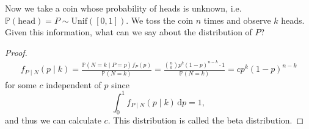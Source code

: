 \begin{eg}
    Now we take a coin whose probability of heads is unknown, i.e. \(\mathbb{P} (\text{head}) = P \sim \mathrm{Unif}([0, 1]) \). We toss the coin \(n\) times and observe \(k\) heads. Given this information, what can we say about the distribution of \(P\)?   
\end{eg}

\begin{proof}
    \begin{align*}
        f_{P \mid N} (p \mid k) = \frac{\mathbb{P} (N = k \mid P = p) f_P(p)}{\mathbb{P} (N = k)} = \frac{\binom{n}{k} p^k (1 - p)^{n - k} \cdot 1}{\mathbb{P} (N = k)} = c p^k (1 - p)^{n - k}
    \end{align*}
    for some \(c\) independent of \(p\) since 
    \[
        \int _0^1 f_{P \mid N} (p \mid k) \, \mathrm{d} p = 1, 
    \]  
    and thus we can calculate \(c\). This distribution is called the beta distribution. 
\end{proof}